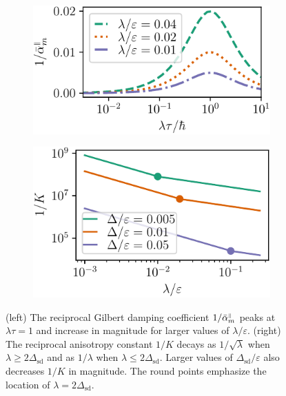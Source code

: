 \begin{figure}
\begin{subfigure}{.5\textwidth}
  \centering
  \includegraphics[width=.95\linewidth]{gfx/inverse_alpha.pdf}
\end{subfigure}%
\begin{subfigure}{.5\textwidth}
  \centering
  \includegraphics[width=.88\linewidth]{gfx/inverse_K.pdf}
\end{subfigure}
\caption{(left) The reciprocal Gilbert damping coefficient $1/\bar{\alpha}_m^{{\scriptscriptstyle\parallel}}$ peaks at $\lambda\tau=1$ and increase in magnitude for larger values of $\lambda/\varepsilon$. (right) The reciprocal anisotropy constant $1/K$ decays as $1/\sqrt{\lambda}$ when $\lambda\geq2\Delta_\text{sd}$ and as $1/{\lambda}$ when $\lambda\leq2\Delta_\text{sd}$. Larger values of $\Delta_\text{sd}/\varepsilon$ also decreases $1/K$ in magnitude. The round points emphasize the location of $\lambda=2\Delta_\text{sd}$.}
\label{fig:max}
\end{figure}

